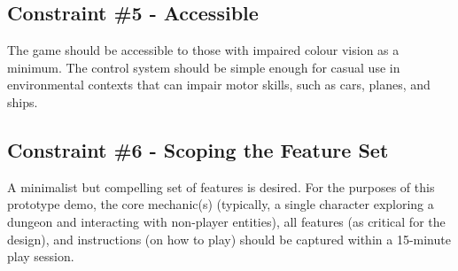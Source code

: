 \documentclass{../../fal_assignment}
\begin{document}
\subsection*{Constraint \#5 - Accessible}
The game should be accessible to those with impaired colour vision as a minimum. The control system should be simple enough for casual use in environmental contexts that can impair motor skills, such as cars, planes, and ships.

\subsection*{Constraint \#6 - Scoping the Feature Set}

A minimalist but compelling set of features is desired. For the purposes of this prototype demo, the core mechanic(s) (typically, a single character exploring a dungeon and interacting with non-player entities), all features (as critical for the design), and instructions (on how to play) should be captured within a 15-minute play session.
\end{document}
